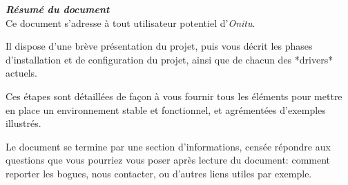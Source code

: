 \thispagestyle{empty}
\vspace*{10mm}

\textbf{\emph{\textcolor{onitu}{\large{Résumé du document} } } }\\

Ce document s'adresse à tout utilisateur potentiel d'\emph{Onitu}.

Il dispose d'une brève présentation du projet, puis vous décrit les phases d'installation et de configuration du projet, ainsi que de chacun des *drivers* actuels.

Ces étapes sont détaillées de façon à vous fournir tous les éléments pour mettre en place un environnement stable et fonctionnel, et agrémentées d'exemples illustrés.

Le document se termine par une section d'informations, censée répondre aux questions que vous pourriez vous poser après lecture du document: comment reporter les bogues, nous contacter, ou d'autres liens utiles par exemple.

\clearpage
